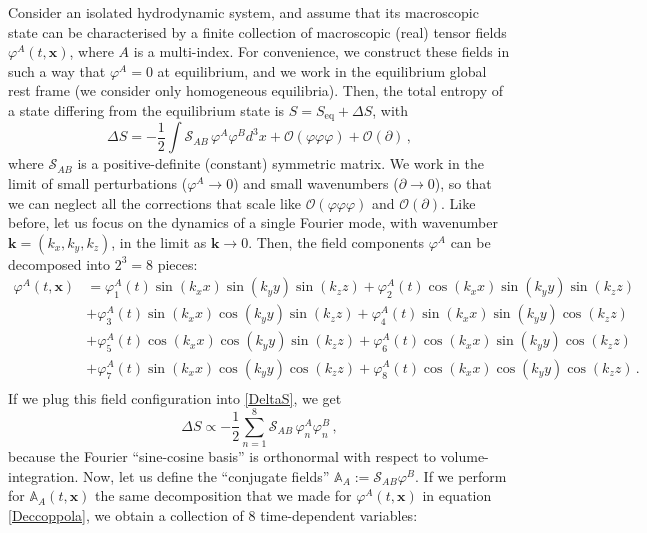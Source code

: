 \documentclass[a4paper, amsfonts, amssymb, amsmath, reprint, showkeys, nofootinbib, twoside, onecolumn,notitlepage]{revtex4-1}
\begin{document}
Consider an isolated hydrodynamic system, and assume that its macroscopic state can be characterised by a finite collection of macroscopic (real) tensor fields $\varphi^A(t,\textbf{x})$, where $A$ is a multi-index. For convenience, we construct these fields in such a way that $\varphi^A=0$ at equilibrium, and we work in the equilibrium global rest frame (we consider only homogeneous equilibria). Then, the total entropy of a state differing from the equilibrium state is $S=S_\text{eq}+\Delta S$, with
\begin{equation}\label{DeltaS}
\Delta S = -\dfrac{1}{2} \int \mathcal{S}_{AB} \,  \varphi^A  \varphi^B d^3 x +\mathcal{O}( \varphi\varphi\varphi) + \mathcal{O}(\partial ) \, ,
\end{equation}
where $\mathcal{S}_{AB}$ is a positive-definite (constant) symmetric matrix. We work in the limit of small perturbations ($\varphi^A \rightarrow 0$) and small wavenumbers ($\partial \rightarrow 0$), so that we can neglect all the corrections that scale like $\mathcal{O}( \varphi\varphi\varphi)$ and $\mathcal{O}(\partial )$. Like before, let us focus on the dynamics of a single Fourier mode, with wavenumber $\textbf{k}=(k_x,k_y,k_z)$, in the limit as $\textbf{k}\rightarrow 0$. Then, the field components $\varphi^A$ can be decomposed into $2^3=8$ pieces:
\begin{equation}\label{Deccoppola}
\begin{split}
\varphi^A(t,\textbf{x})&{}= \varphi^A_1(t) \sin(k_x x)\sin(k_y y)\sin(k_z z) + \varphi^A_2(t) \cos(k_x x)\sin(k_y y)\sin(k_z z) \\
& +\varphi^A_3(t) \sin(k_x x)\cos(k_y y)\sin(k_z z) +\varphi^A_4(t) \sin(k_x x)\sin(k_y y)\cos(k_z z) \\
& +\varphi^A_5(t) \cos(k_x x)\cos(k_y y)\sin(k_z z) +\varphi^A_6(t) \cos(k_x x)\sin(k_y y)\cos(k_z z) \\
& +\varphi^A_7(t) \sin(k_x x)\cos(k_y y)\cos(k_z z) +\varphi^A_8(t) \cos(k_x x)\cos(k_y y)\cos(k_z z) \, .\\
\end{split}
\end{equation} 
If we plug this field configuration into \eqref{DeltaS}, we get
\begin{equation}\label{Grinuzzo}
\Delta S \propto -\dfrac{1}{2} \sum_{n=1}^8 \mathcal{S}_{AB} \,  \varphi^A_n  \varphi^B_n  \, ,
\end{equation}
because the Fourier ``sine-cosine basis'' is orthonormal with respect to volume-integration. Now, let us define the ``conjugate fields'' $\mathbb{A}_A:= \mathcal{S}_{AB}\varphi^B$. If we perform for $\mathbb{A}_A(t,\textbf{x})$ the same decomposition that we made for $\varphi^A(t,\textbf{x})$ in equation \eqref{Deccoppola}, we obtain a collection of 8 time-dependent variables:
\end{document}
